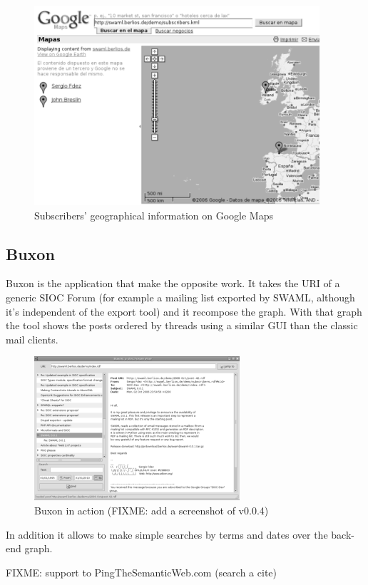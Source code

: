 \documentclass{llncs}
\begin{document}
\begin{figure}[ht]
 \centering
 \includegraphics[bb=0 0 400 280]{images/googlemaps.png}
 \caption{Subscribers' geographical information on Google Maps}
\end{figure}

\subsection{Buxon}

Buxon is the application that make the opposite work. It takes the URI of a 
generic SIOC Forum (for example a mailing list exported by SWAML, although 
it's independent of the export tool) and it recompose the graph. With that
graph the tool shows the posts ordered by threads using a similar GUI than 
the classic mail clients.

\begin{figure}[ht]
 \centering
 \includegraphics[bb=0 0 288 202]{images/buxon.png}
 \caption{Buxon in action (FIXME: add a screenshot of v0.0.4)}
\end{figure}

In addition it allows to make simple searches by terms and dates over 
the back-end graph.

FIXME: support to PingTheSemanticWeb.com (search a cite)
\end{document}
